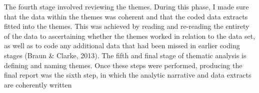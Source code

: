 \documentclass[11.5pt]{sig-alternate}
\begin{document}
\begin{large}
\begin{table}[h]
\captionsetup{font=large, labelfont=it}
\caption{\textit{Themes and codes obtained from the qualitative data}}
\label{tab:table-2}
\end{table}

The fourth stage involved reviewing the themes. During this phase, I made sure that the data within the themes was coherent and that the coded data extracts fitted into the themes. This was achieved by reading and re-reading the entirety of the data to ascertaining whether the themes worked in relation to the data set, as well as to code any additional data that had been missed in earlier coding stages (Braun \& Clarke, 2013). The fifth and final stage of thematic analysis is defining and naming themes. Once these steps were performed, producing the final report was the sixth step, in which the analytic narrative and data extracts are coherently written


\end{large}
\end{document}
